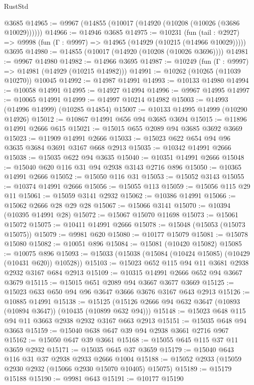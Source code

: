 \begin{lexlean}{RustStd}
\begin{coremodule}
    @3685
@14965 := @9967 (@14855 (@10017 (@14920 (@10208 (@10026 (@3686 @10029))))))
@14966 := @14946 @3685
@14975 := @10231
    (fun (tail : @2927) => @9998 (fun (Γ : @9997) => @14965 (@14929 (@10215 (@14966 @10029)))))
    @3695
@14980 := @14855 (@10017 (@14920 (@10208 (@10026 @3696))))
@14981 := @9967 @14980
@14982 := @14966 @3695
@14987 := @10249 (fun (Γ : @9997) => @14981 (@14929 (@10215 @14982)))
@14991 := @10262 (@10265 (@11039 @10270)) @10045
@14992 := @14987 @14991
@14993 := @10133 @14980
@14994 := @10058 @14991
@14995 := @14927 @14994
@14996 := @9967 @14995
@14997 := @10065 @14991
@14999 := @14997 @10214 @14982
@15003 := @14993 (@14996 @14999) (@10285 @14854)
@15007 := @10133 @14995 @14999 (@10290 @14926)
@15012 := @10867 @14991 @656 @94 @3685 @3694
@15015 := @11896 @14991 @2666 @615
@15021 := @15015 @655 @2089 @94 @3685 @3692 @3669
@15023 := @11909 @14991 @2666
@15033 := @15023 @622 @654 @94 @96 @3635 @3684 @3691 @3167 @668 @2913
@15035 := @10342 @14991 @2666
@15038 := @15035 @622 @94 @3635
@15040 := @10351 @14991 @2666
@15048 := @15040 @620 @116 @31 @94 @2938 @3143 @2716 @896
@15050 := @10365 @14991 @2666
@15052 := @15050 @116 @31
@15053 := @15052 @3143
@15055 := @10374 @14991 @2666
@15056 := @15055 @113
@15059 := @15056 @115 @29 @11
@15061 := @15059 @3141 @2932
@15062 := @10386 @14991
@15066 := @15062 @2666 @28 @29 @28
@15067 := @15066 @3141
@15070 := @10394 (@10395 @14991 @28)
@15072 := @15067 @15070 @11698
@15073 := @15061 @15072
@15075 := @10411 @14991 @2666
@15078 := @15048 (@15053 (@15073 @15075))
@15079 := @9981 @620
@15080 := @10177 @15079
@15081 := @15078 @15080
@15082 := @10051 @896
@15084 := @15081 (@10420 @15082)
@15085 := @10075 @896
@15093 := @15033 (@15038 (@15084 (@10424 @15085) (@10429 (@10431 @620)) @10528))
@15103 := @15023 @652 @115 @94 @11 @3681 @2938 @2932 @3167 @684 @2913
@15109 := @10315 @14991 @2666 @652 @94 @3667 @3679
@15115 := @15015 @651 @2089 @94 @3667 @3677 @3669
@15125 := @15023 @633 @650 @94 @96 @3647 @3666 @3676 @3167 @643 @2913
@15126 := @10885 @14991
@15138 := @15125 (@15126 @2666 @94 @632 @3647 (@10893 (@10894 @3647)) (@10435 (@10899 @632 @94)))
@15148 := @15023 @648 @115 @94 @11 @3663 @2938 @2932 @3167 @663 @2913
@15151 := @15035 @648 @94 @3663
@15159 := @15040 @638 @647 @39 @94 @2938 @3661 @2716 @967
@15162 := @15050 @647 @39 @3661
@15168 := @15055 @645 @115 @37 @11 @3659 @2932
@15171 := @15035 @645 @37 @3659
@15179 := @15040 @643 @116 @31 @37 @2938 @2933 @2666 @1004
@15188 := @15052 @2933 (@15059 @2930 @2932 (@15066 @2930 @15070 @10405) @15075)
@15189 := @15179 @15188
@15190 := @9981 @643
@15191 := @10177 @15190

\end{coremodule}
\end{lexlean}
